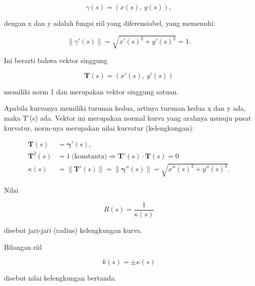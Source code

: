 \documentclass{article}
\newenvironment{eulernotebook}{\par}{\par}
\newenvironment{eulercomment}{\par\medskip}{\par\medskip}
\newenvironment{eulerformula}{}{}
\begin{document}
\begin{eulernotebook}
\begin{eulercomment}
\begin{eulercomment}
\begin{eulercomment}
\begin{eulercomment}
\begin{eulercomment}
\end{eulercomment}
\begin{eulerformula}
\[
\gamma(s) = (x(s),\ y(s)),
\]
\end{eulerformula}
\begin{eulercomment}
dengan x dan y adalah fungsi riil yang diferensiabel, yang memenuhi:

\end{eulercomment}
\begin{eulerformula}
\[
\|\gamma'(s)\|=\sqrt{x'(s)^2+y'(s)^2}=1.
\]
\end{eulerformula}
\begin{eulercomment}
Ini berarti bahwa vektor singgung


\end{eulercomment}
\begin{eulerformula}
\[
\mathbf{T}(s)=(x'(s),\ y'(s))
\]
\end{eulerformula}
\begin{eulercomment}
memiliki norm 1 dan merupakan vektor singgung satuan.

Apabila kurvanya memiliki turunan kedua, artinya turunan kedua x dan y ada, maka T'(s) ada. Vektor ini merupakan normal kurva yang
arahnya menuju pusat kurvatur, norm-nya merupakan nilai kurvatur (kelengkungan):

\end{eulercomment}
\begin{eulerformula}
\[
 \begin{aligned}\mathbf{T}(s) &= \mathbf{\gamma}'(s),\\ \mathbf{T}^{2}(s) &=1\ \text{(konstanta)}\Rightarrow \mathbf{T}'(s)\cdot \mathbf{T}(s)=0\\ \kappa(s) &=\|\mathbf {T}'(s)\|= \|\mathbf{\gamma}''(s)\|=\sqrt{x''(s)^{2}+y''(s)^{2}}.\end{aligned}
\]
\end{eulerformula}
\begin{eulercomment}
Nilai

\end{eulercomment}
\begin{eulerformula}
\[
R(s)=\frac{1}{\kappa(s)}
\]
\end{eulerformula}
\begin{eulercomment}
disebut jari-jari (radius) kelengkungan kurva.

Bilangan riil

\end{eulercomment}
\begin{eulerformula}
\[
 k(s) = \pm\kappa(s)
\]
\end{eulerformula}
\begin{eulercomment}
disebut nilai kelengkungan bertanda.


\end{eulercomment}
\end{eulercomment}
\end{eulercomment}
\end{eulercomment}
\end{eulercomment}
\end{eulernotebook}
\end{document}
